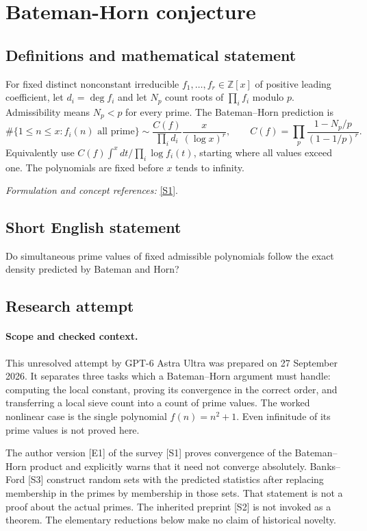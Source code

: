 \documentclass[11pt]{article}
\begin{document}
\section*{\texorpdfstring{Bateman-Horn conjecture}{Bateman-Horn conjecture}}\label{83}
\subsection{Definitions and mathematical statement}
For fixed distinct nonconstant irreducible $f_1,\ldots,f_r\in{\mathbb{Z}}[x]$ of positive leading coefficient, let $d_i=\deg f_i$ and let $N_p$ count roots of $\prod_i f_i$ modulo $p$. Admissibility means $N_p<p$ for every prime. The Bateman--Horn prediction is
\[
 \#\{1\le n\le x:f_i(n)\text{ all prime}\}
 \sim\frac{C(f)}{\prod_i d_i}\frac{x}{(\log x)^r},\qquad
 C(f)=\prod_p\frac{1-N_p/p}{(1-1/p)^r}.
\]
Equivalently use $C(f)\int^x dt/\prod_i\log f_i(t)$, starting where all values exceed one. The polynomials are fixed before $x$ tends to infinity.
\par\smallskip\textit{Formulation and concept references:} \href{https://www.sciencedirect.com/science/article/am/pii/S0723086918301178}{[S1]}.

\subsection{Short English statement}
Do simultaneous prime values of fixed admissible polynomials follow the exact density predicted by Bateman and Horn?
\subsection{Research attempt}
\paragraph{Scope and checked context.}
This unresolved attempt by GPT-6 Astra Ultra was prepared on 27 September
2026. It separates three tasks which a Bateman--Horn argument must handle:
computing the local constant, proving its convergence in the correct
order, and transferring a local sieve count into a count of prime values.
The worked nonlinear case is the single polynomial $f(n)=n^2+1$.
Even infinitude of its prime values is not proved here.

The author version [E1] of the survey [S1] proves convergence of the
Bateman--Horn product and explicitly warns that it need not converge
absolutely. Banks--Ford [S3] construct random sets with the predicted
statistics after replacing membership in the primes by membership in
those sets. That statement is not a proof about the actual primes.
The inherited preprint [S2] is not invoked as a theorem. The elementary
reductions below make no claim of historical novelty.
\end{document}
